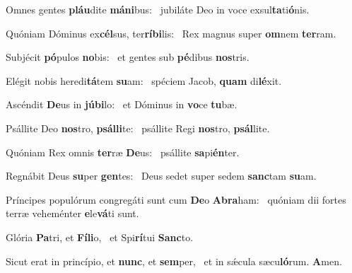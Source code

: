 \item Omnes gentes \textbf{pláu}dite \textbf{má}\textbf{ni}bus:~\psstar{} jubiláte Deo in voce exsul\textbf{ta}ti\textbf{ó}nis.
\item Quóniam Dóminus ex\textbf{cél}sus, ter\textbf{rí}\textbf{bi}lis:~\psstar{} Rex magnus super \textbf{om}nem \textbf{ter}ram.
\item Subjécit \textbf{pó}pulos \textbf{no}bis:~\psstar{} et gentes sub \textbf{pé}dibus \textbf{nos}tris.
\item Elégit nobis heredi\textbf{tá}tem \textbf{su}am:~\psstar{} spéciem Jacob, \textbf{quam} di\textbf{lé}xit.
\item Ascéndit \textbf{De}us in \textbf{jú}\textbf{bi}lo:~\psstar{} et Dóminus in \textbf{vo}ce \textbf{tu}bæ.
\item Psállite Deo \textbf{nos}tro, \textbf{psál}\textbf{li}te:~\psstar{} psállite Regi \textbf{nos}tro, \textbf{psál}lite.
\item Quóniam Rex omnis \textbf{ter}ræ \textbf{De}us:~\psstar{} psállite \textbf{sa}pi\textbf{én}ter.
\item Regnábit Deus \textbf{su}per \textbf{gen}tes:~\psstar{} Deus sedet super sedem \textbf{sanc}tam \textbf{su}am.
\item Príncipes populórum congre\-gáti sunt cum \textbf{De}o \textbf{A}\textbf{bra}ham:~\psstar{} quóniam dii fortes terræ veheménter \textbf{e}le\textbf{vá}ti sunt.
\item Glória \textbf{Pa}tri, et \textbf{Fí}\textbf{li}o,~\psstar{} et Spi\textbf{rí}tui \textbf{Sanc}to.
\item Sicut erat in princípio, et \textbf{nunc}, et \textbf{sem}per,~\psstar{} et in sǽcula sæcu\textbf{ló}rum. \textbf{A}men.

